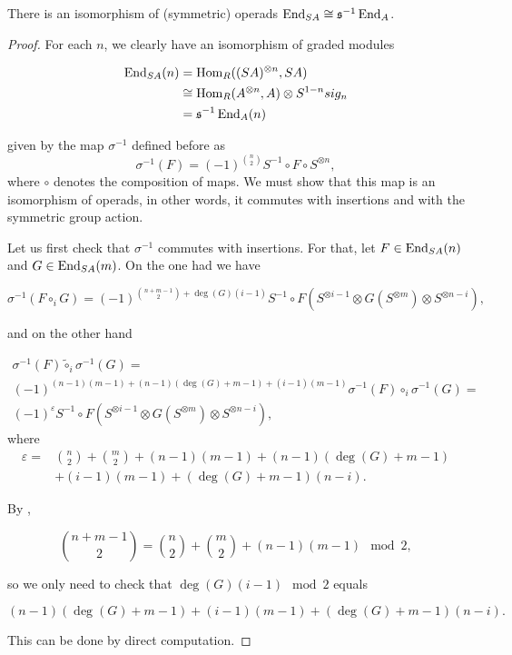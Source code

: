 \documentclass[Thesis.tex]{subfiles}
\begin{document}
\begin{thm}\label{proofthm}
There is an isomorphism of (symmetric) operads $\operatorname{End}_{S A}\cong \mathfrak{s}^{-1}\operatorname{End}_A$.
\end{thm}
\begin{proof}
For each $n$, we clearly have an isomorphism of graded modules

\begin{align*}
\operatorname{End}_{S A}(n)&=\operatorname{Hom}_R((S A)^{\otimes n},S A)\\
&\cong\operatorname{Hom}_R(A^{\otimes n},A)\otimes S^{1-n}sig_n\\
&= \mathfrak{s}^{-1}\operatorname{End}_A(n)
\end{align*}

given by the map $\sigma^{-1}$ defined before as \[\sigma^{-1}(F)=(-1)^{\binom{n}{2}}S^{-1}\circ F\circ S^{\otimes n},\] where $\circ$ denotes the composition of maps. We must show that this map is an isomorphism of operads, in other words, it commutes with insertions and with the symmetric group action.

Let us first check that $\sigma^{-1}$ commutes with insertions. For that, let $F\in \operatorname{End}_{S A}(n)$ and $G\in \operatorname{End}_{S A}(m)$. On the one had we have 

\[\sigma^{-1}(F\circ_i G)=(-1)^{\binom{n+m-1}{2}+\deg(G)(i-1)}S^{-1}\circ F(S^{\otimes i-1}\otimes G(S^{\otimes m})\otimes S^{\otimes n-i}),\]


and on the other hand

\begin{align*}
\sigma^{-1}(F)\tilde{\circ}_i\sigma^{-1}(G)=&\\
(-1)^{(n-1)(m-1)+(n-1)(\deg(G)+m-1)+(i-1)(m-1)}\sigma^{-1}(F)\circ_i\sigma^{-1}(G)=&\\
(-1)^{\varepsilon}S^{-1}\circ F(S^{\otimes i-1}\otimes G(S^{\otimes m})\otimes S^{\otimes n-i}),&
\end{align*}
where
\begin{align*}
\varepsilon=&\binom{n}{2}+\binom{m}{2}+(n-1)(m-1)+(n-1)(\deg(G)+m-1)\\
&+(i-1)(m-1)+(\deg(G)+m-1)(n-i).
\end{align*}

By , 

\[\binom{n+m-1}{2}=\binom{n}{2}+\binom{m}{2}+(n-1)(m-1)\mod 2,\]

so we only need to check that $\deg(G)(i-1)\mod 2$ equals

\[(n-1)(\deg(G)+m-1)+(i-1)(m-1)+(\deg(G)+m-1)(n-i).\]

This can be done by direct computation.


\end{proof}
\end{document}
